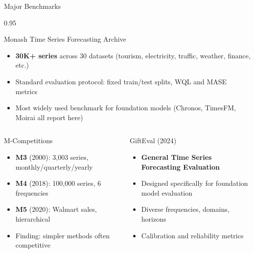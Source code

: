 \documentclass[9pt, aspectratio=169, t]{beamer}
\begin{document}
\begin{frame}{Major Benchmarks}
    \begin{cminipage}{0.95\textwidth}
    \vspace{-2mm}
    {\scriptsize
    \begin{block}{Monash Time Series Forecasting Archive}
        \begin{itemize}\setlength{\itemsep}{0pt}
            \item \textbf{30K+ series} across 30 datasets (tourism, electricity, traffic, weather, finance, etc.)
            \item Standard evaluation protocol: fixed train/test splits, WQL and MASE metrics
            \item Most widely used benchmark for foundation models (Chronos, TimesFM, Moirai all report here)
        \end{itemize}
    \end{block}
    \vspace{-2mm}
    \begin{columns}[T]
        \begin{exampleblock}{M-Competitions}
            \begin{itemize}\setlength{\itemsep}{0pt}
                \item \textbf{M3} (2000): 3{,}003 series, monthly/quarterly/yearly
                \item \textbf{M4} (2018): 100{,}000 series, 6 frequencies
                \item \textbf{M5} (2020): Walmart sales, hierarchical
                \item Finding: simpler methods often competitive
            \end{itemize}
        \end{exampleblock}

        \begin{alertblock}{GiftEval (2024)}
            \begin{itemize}\setlength{\itemsep}{0pt}
                \item \textbf{General Time Series Forecasting Evaluation}
                \item Designed specifically for foundation model evaluation
                \item Diverse frequencies, domains, horizons
                \item Calibration and reliability metrics
            \end{itemize}
        \end{alertblock}
    \end{columns}
    }
    \end{cminipage}
\end{frame}
\end{document}
